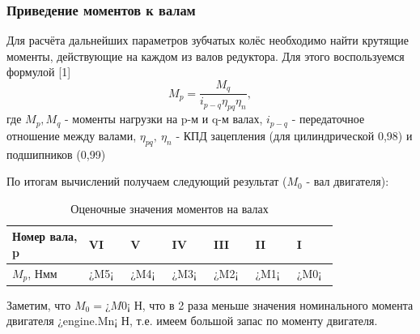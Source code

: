 \documentclass[14pt,a4paper,russian]{scrartcl}
\begin{document}
    \subsubsection{Приведение моментов к валам}
        Для расчёта дальнейших параметров зубчатых колёс необходимо найти крутящие моменты,
        действующие на каждом из валов редуктора. Для этого воспользуемся формулой [1]
        \[ M_p = \frac{M_q}{i_{p-q}\eta_{pq}\eta_n}, \]
        где \( M_p, M_q \) - моменты нагрузки на p-м и q-м валах,
            \( i_{p-q} \) - передаточное отношение между валами,
            \( \eta_{pq},\ \eta_n \) - КПД зацепления (для цилиндрической 0,98) и подшипников (0,99)\par
        
        По итогам вычислений получаем следующий результат (\( M_0 \) - вал двигателя):
        \begin{table}[h!]
            \begin{center}
                \begin{tabular}{p{0.2\linewidth}p{0.1\linewidth}p{0.1\linewidth}p{0.1\linewidth}p{0.1\linewidth}p{0.1\linewidth}p{0.1\linewidth}}
                    \hline
                    Номер вала, p & VI & V & IV & III & II & I \\
                    \hline
                    \( M_p \), Нмм & ¿M5¡ & ¿M4¡ & ¿M3¡ & ¿M2¡ & ¿M1¡ & ¿M0¡ \\
                    \hline
                \end{tabular}
                \caption{Оценочные значения моментов на валах}\label{tab:moments__shaft_estimate}
            \end{center}
        \end{table}

        Заметим, что \( M_0=¿M0¡ \) Н, что в 2 раза меньше значения номинального момента двигателя ¿engine.Mn¡ Н,
        т.е. имеем большой запас по моменту двигателя.
\end{document}
